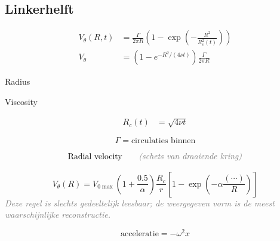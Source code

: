 \documentclass[11pt,a4paper]{article}
\newcommand{\uncertain}[1]{\textit{\textcolor{gray}{#1}}}
\begin{document}
\begin{minipage}[t]{0.48\textwidth}
\subsection*{Linkerhelft}
\begin{align*}
V_\theta(R,t)
&=
\frac{\Gamma}{2\pi R}
\left(
1-\exp\!\left(
-\frac{R^2}{R_c^2(t)}
\right)
\right)
\\[0.3em]
V_\theta
&=
\left(
1-e^{-R^2/(4\nu t)}
\right)
\frac{\Gamma}{2\pi R}
\end{align*}

Radius

Viscosity

\begin{align*}
R_c(t) &= \sqrt{4\nu t}
\end{align*}

\[
\Gamma = \text{circulaties binnen}
\]

\[
\text{Radial velocity}
\qquad \text{\uncertain{(schets van draaiende kring)}}
\]

\[
V_\theta(R)
=
V_{0\max}
\left(1+\frac{0.5}{\alpha}\right)
\frac{R_c}{r}
\left[1-\exp\!\left(-\alpha \frac{(\cdots)}{R}\right)\right]
\]
\uncertain{Deze regel is slechts gedeeltelijk leesbaar; de weergegeven vorm is de meest waarschijnlijke reconstructie.}

\[
\text{acceleratie} = -\omega^2 x
\]
\end{minipage}
\hfill
\end{document}
